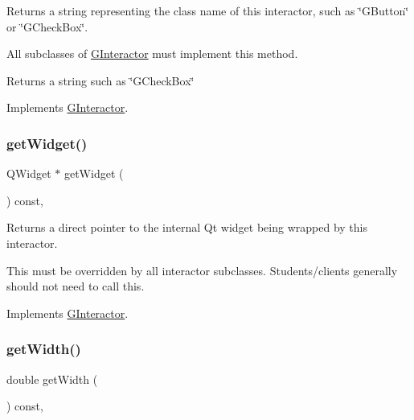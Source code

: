 Returns a string representing the class name of this interactor, such as \char`\"{}\+G\+Button\char`\"{} or \char`\"{}\+G\+Check\+Box\char`\"{}. 

All subclasses of \mbox{\hyperlink{classsgl_1_1GInteractor}{G\+Interactor}} must implement this method. \begin{DoxyReturn}{Returns}
a string such as \char`\"{}\+G\+Check\+Box\char`\"{} 
\end{DoxyReturn}


Implements \mbox{\hyperlink{classsgl_1_1GInteractor_a44c407a54a20dd0f2fff30338289299d}{G\+Interactor}}.

\mbox{\label{classsgl_1_1GTable_a3b33a602b31a6b809d020535a59db3b4}} 
\subsubsection{\texorpdfstring{get\+Widget()}{getWidget()}}
{\footnotesize\ttfamily Q\+Widget $\ast$ get\+Widget (\begin{DoxyParamCaption}{ }\end{DoxyParamCaption}) const\hspace{0.3cm}{\ttfamily [override]}, {\ttfamily [virtual]}}



Returns a direct pointer to the internal Qt widget being wrapped by this interactor. 

This must be overridden by all interactor subclasses. Students/clients generally should not need to call this. 

Implements \mbox{\hyperlink{classsgl_1_1GInteractor}{G\+Interactor}}.

\mbox{\label{classsgl_1_1GInteractor_a0ed2965abd4f5701d2cadf71239faf19}} 
\subsubsection{\texorpdfstring{get\+Width()}{getWidth()}}
{\footnotesize\ttfamily double get\+Width (\begin{DoxyParamCaption}{ }\end{DoxyParamCaption}) const\hspace{0.3cm}{\ttfamily [virtual]}, {\ttfamily [inherited]}}



